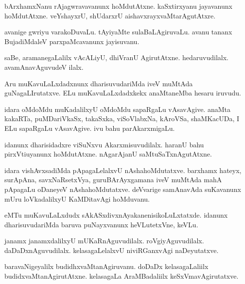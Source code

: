 \documentclass{article}
\begin{document}
\begin{mng}%
bArxhamxNanu rAjagwravavanunx hoMdutAtxne. kaSxtirxyanu jayavanunx 
hoMdutAtxne. veYshayxrU, shUdarxrU aishavxrayxvaMtarAgutAtxre.
\end{mng}

\begin{mng}%
avanige gwriyu varakoDuvaLu. tAyiyaMte sulaBaLAgiruvaLu. avanu tananx 
BujadiMdaleV parxpaMcavanunx jayisuvanu.
\end{mng}

\begin{mng}%
saBe, aramanegaLalilx vAcALiyU, dhiVranU AgirutAtxne. hedaruvudilalx. 
avamAnavAguvudeV ilalx.
\end{mng}

\begin{mng}%
Aru muKavuLaLxdadxnunx dharisuvudariMda iveV muMtAda guNagaLIrutatxve. 
ELu muKavuLaLxdadxkekx anaMtaneMba hesaru iruvudu.
\end{mng}

\begin{mng}%
idara oMdoMdu muKadalilxyU oMdoMdu sapaRgaLu vAsavAgive. anaMta 
kakaRTa, puMDariVkaSx, takaSxka, viSoVlabxNa, kAroVSa, shaMKacUDa, I 
ELu sapaRgaLu vAsavAgive. ivu bahu parAkarxmigaLu.
\end{mng}

\begin{mng}%
idanunx dharisidadxre viSuNxvu Akarxmisuvudilalx. haranU bahu 
pirxVtiuyanunx hoMdutAtxne. nAgarAjanU saMtuSaTxnAgutAtxne.
\end{mng}

\begin{mng}%
idara vishAvxsadiMda pApagaLelalxvU nAshahoMdutatxve. barxhamx hateyx, 
surApAna, savxNaRsetxVya, guruBArAyxgamana iveV muMtAda mahA pApagaLu 
oDaneyeV nAshahoMdutatxve. deVvarige samAnavAda suKavanunx mUru 
loVkadalilxyU KaMDitavAgi hoMduvanu.
\end{mng}

\begin{mng}%
eMTu muKavuLaLxdudx sAkASxdivxnAyakanenisikoLuLxtatxde. idanunx 
dharisuvudariMda baruva puNayxvanunx heVLutetxVne, keVLu.
\end{mng}

\begin{mng}%
janamx janamxdalilxyU mUKaRnAguvudilalx. roVgiyAguvudilalx. 
daDaDxnAguvudilalx. kelasagaLelalxvU niviRGanxvAgi naDeyutatxve.
\end{mng}

\begin{mng}%
baravaNigeyalilx budidhxvaMtanAgiruvanu. doDaDx kelasagaLaliilx 
budidxvaMtanAgirutAtxne. kelasagaLa AraMBadaliilx keSxVmavAgirutatxve.
\end{mng}
\end{document}
